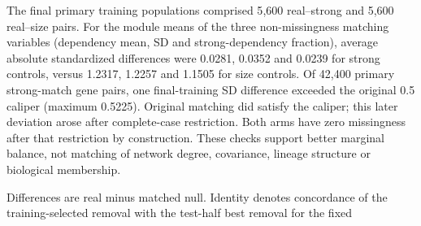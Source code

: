 \documentclass[11pt,letterpaper]{article}
\begin{document}
The final primary training populations comprised 5{,}600 real--strong and
5{,}600 real--size pairs. For the module means of the three non-missingness
matching variables (dependency mean, SD and strong-dependency fraction),
average absolute standardized differences were 0.0281, 0.0352 and 0.0239
for strong controls, versus 1.2317, 1.2257 and 1.1505 for size controls.
Of 42{,}400 primary strong-match gene pairs, one final-training SD difference
exceeded the original 0.5 caliper (maximum 0.5225). Original matching did
satisfy the caliper; this later deviation arose after complete-case restriction.
Both arms have zero missingness after that restriction by construction.
These checks support better marginal balance, not matching of network degree,
covariance, lineage structure or biological membership.

\begin{table}[htbp]
\centering
\small
\caption{\textbf{All eight prespecified tests in the strong-null analysis.}}
\label{tab:sr_r15_null}
\par\smallskip
\begin{minipage}{\textwidth}
\footnotesize
Differences are real minus matched null. Identity denotes concordance of
the training-selected removal with the test-half best removal for the fixed

\end{minipage}
\end{table}
\end{document}
